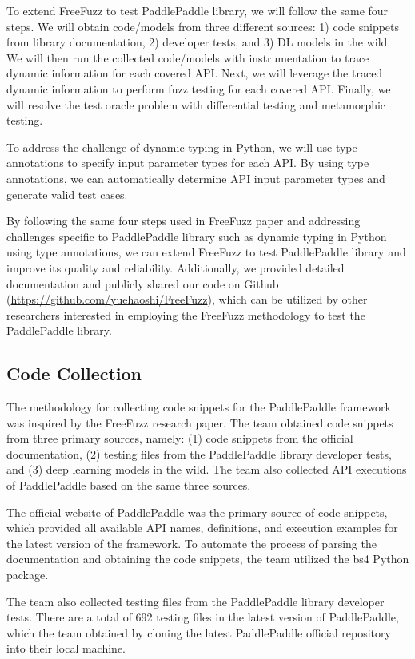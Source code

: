 \documentclass[sigconf]{acmart}
\begin{document}
To extend FreeFuzz to test PaddlePaddle library, we will follow the same four steps. 
We will obtain code/models from three different sources: 1) code snippets from library documentation, 2) developer tests, and 3) DL models in the wild. 
We will then run the collected code/models with instrumentation to trace dynamic information for each covered API. 
Next, we will leverage the traced dynamic information to perform fuzz testing for each covered API. 
Finally, we will resolve the test oracle problem with differential testing and metamorphic testing.

To address the challenge of dynamic typing in Python, we will use type annotations to specify input parameter types for each API. 
By using type annotations, we can automatically determine API input parameter types and generate valid test cases.

By following the same four steps used in FreeFuzz paper and addressing challenges specific to PaddlePaddle library such as dynamic typing in Python using type annotations, 
we can extend FreeFuzz to test PaddlePaddle library and improve its quality and reliability. Additionally, we provided detailed documentation and publicly shared our code on Github (\href{https://github.com/yuehaoshi/FreeFuzz}{https://github.com/yuehaoshi/FreeFuzz}), 
which can be utilized by other researchers interested in employing the FreeFuzz methodology to test the PaddlePaddle library.
  
  \subsection{Code Collection}
  The methodology for collecting code snippets for the PaddlePaddle framework was inspired by the FreeFuzz research paper. 
  The team obtained code snippets from three primary sources, namely: (1) code snippets from the official documentation, 
  (2) testing files from the PaddlePaddle library developer tests, and (3) deep learning models in the wild. 
  The team also collected API executions of PaddlePaddle based on the same three sources.

  The official website of PaddlePaddle was the primary source of code snippets, which provided all available API names, 
  definitions, and execution examples for the latest version of the framework. To automate the process of parsing the documentation and obtaining the code snippets, 
  the team utilized the bs4 Python package. 

  The team also collected testing files from the PaddlePaddle library developer tests. 
  There are a total of 692 testing files in the latest version of PaddlePaddle, which the team obtained by cloning the latest PaddlePaddle official repository into their local machine.
\end{document}
